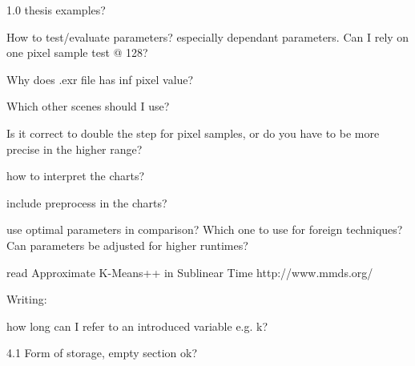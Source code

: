 1.0 thesis examples?

How to test/evaluate parameters? especially dependant parameters. Can I rely on one pixel sample test @ 128?

Why does .exr file has inf pixel value?

Which other scenes should I use?

Is it correct to double the step for pixel samples, or do you have to be more precise in the higher range?

how to interpret the charts?

include preprocess in the charts?

use optimal parameters in comparison? Which one to use for foreign techniques? Can parameters be adjusted for higher runtimes?


read
Approximate K-Means++ in Sublinear Time
http://www.mmds.org/



Writing:

how long can I refer to an introduced variable e.g. k?

4.1 Form of storage, empty section ok?
